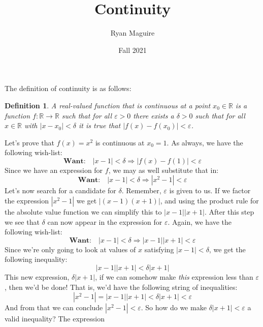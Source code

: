 \documentclass{article}
\title{Continuity}
\author{Ryan Maguire}
\date{Fall 2021}
\theoremstyle{normal}
\newtheorem{definition}{Definition}
\begin{document}
    \maketitle
    The definition of continuity is as follows:
    \begin{definition}
        A real-valued function that is continuous at a point
        $x_{0}\in\mathbb{R}$ is a function $f:\mathbb{R}\rightarrow\mathbb{R}$
        such that for all $\varepsilon>0$ there exists a $\delta>0$ such that
        for all $x\in\mathbb{R}$ with $|x-x_{0}|<\delta$ it is true that
        $|f(x)-f(x_{0})|<\varepsilon$.
    \end{definition}
    Let's prove that $f(x)=x^{2}$ is continuous at $x_{0}=1$. As always, we
    have the following wish-list:
    \begin{equation}
        \textbf{Want:}\quad|x-1|<\delta
        \Rightarrow|f(x)-f(1)|<\varepsilon
    \end{equation}
    Since we have an expression for $f$, we may as well substitute that in:
    \begin{equation}
        \textbf{Want:}\quad|x-1|<\delta
        \Rightarrow|x^{2}-1|<\varepsilon
    \end{equation}
    Let's now search for a candidate for $\delta$. Remember, $\varepsilon$ is
    given to us. If we factor the expression $|x^{2}-1|$ we get
    $|(x-1)(x+1)|$, and using the product rule for the absolute value function
    we can simplify this to $|x-1||x+1|$. After this step we see that $\delta$
    can now appear in the expression for $\varepsilon$. Again, we have the
    following wish-list:
    \begin{equation}
        \textbf{Want:}\quad|x-1|<\delta
        \Rightarrow|x-1||x+1|<\varepsilon
    \end{equation}
    Since we're only going to look at values of $x$ satisfying
    $|x-1|<\delta$, we get the following inequality:
    \begin{equation}
        |x-1||x+1|<\delta|x+1|
    \end{equation}
    This new expression, $\delta|x+1|$, if we can somehow make \textit{this}
    expression less than $\varepsilon$, then we'd be done! That is, we'd
    have the following string of inequalities:
    \begin{equation}
        |x^{2}-1|=|x-1||x+1|<\delta|x+1|<\varepsilon
    \end{equation}
    And from that we can conclude $|x^{2}-1|<\varepsilon$. So how do we make
    $\delta|x+1|<\varepsilon$ a valid inequality? The expression
\end{document}
